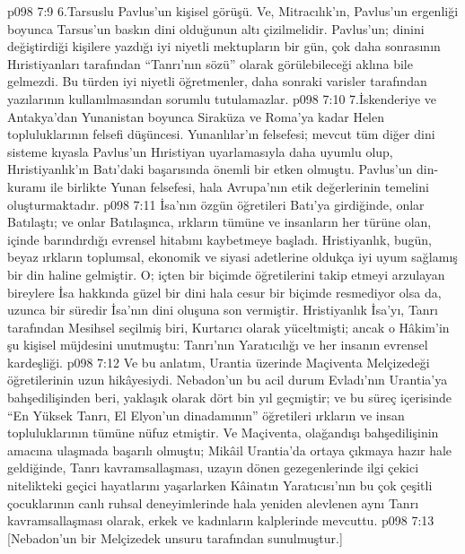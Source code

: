 \vs p098 7:9 6.\bibnobreakspace Tarsuslu Pavlus’un kişisel görüşü. Ve, Mitracılık’ın, Pavlus’un ergenliği boyunca Tarsus’un baskın dini olduğunun altı çizilmelidir. Pavlus’un; dinini değiştirdiği kişilere yazdığı iyi niyetli mektupların bir gün, çok daha sonrasının Hıristiyanları tarafından “Tanrı’nın sözü” olarak görülebileceği aklına bile gelmezdi. Bu türden iyi niyetli öğretmenler, daha sonraki varisler tarafından yazılarının kullanılmasından sorumlu tutulamazlar.
\vs p098 7:10 7.\bibnobreakspace İskenderiye ve Antakya’dan Yunanistan boyunca Siraküza ve Roma’ya kadar Helen topluluklarının felsefi düşüncesi. Yunanlılar’ın felsefesi; mevcut tüm diğer dini sisteme kıyasla Pavlus’un Hıristiyan uyarlamasıyla daha uyumlu olup, Hıristiyanlık’ın Batı’daki başarısında önemli bir etken olmuştu. Pavlus’un din\hyp{}kuramı ile birlikte Yunan felsefesi, hala Avrupa’nın etik değerlerinin temelini oluşturmaktadır.
\vs p098 7:11 İsa’nın özgün öğretileri Batı’ya girdiğinde, onlar Batılaştı; ve onlar Batılaşınca, ırkların tümüne ve insanların her türüne olan, içinde barındırdığı evrensel hitabını kaybetmeye başladı. Hristiyanlık, bugün, beyaz ırkların toplumsal, ekonomik ve siyasi adetlerine oldukça iyi uyum sağlamış bir din haline gelmiştir. O; içten bir biçimde öğretilerini takip etmeyi arzulayan bireylere İsa hakkında güzel bir dini hala cesur bir biçimde resmediyor olsa da, uzunca bir süredir İsa’nın dini oluşuna son vermiştir. Hristiyanlık İsa’yı, Tanrı tarafından Mesihsel seçilmiş biri, Kurtarıcı olarak yüceltmişti; ancak o Hâkim’in şu kişisel müjdesini unutmuştu: Tanrı’nın Yaratıcılığı ve her insanın evrensel kardeşliği.
\vs p098 7:12 Ve bu anlatım, Urantia üzerinde Maçiventa Melçizedeği öğretilerinin uzun hikâyesiydi. Nebadon’un bu acil durum Evladı’nın Urantia’ya bahşedilişinden beri, yaklaşık olarak dört bin yıl geçmiştir; ve bu süreç içerisinde “En Yüksek Tanrı, El Elyon’un dinadamının” öğretileri ırkların ve insan topluluklarının tümüne nüfuz etmiştir. Ve Maçiventa, olağandışı bahşedilişinin amacına ulaşmada başarılı olmuştu; Mikâil Urantia’da ortaya çıkmaya hazır hale geldiğinde, Tanrı kavramsallaşması, uzayın dönen gezegenlerinde ilgi çekici nitelikteki geçici hayatlarını yaşarlarken Kâinatın Yaratıcısı’nın bu çok çeşitli çocuklarının canlı ruhsal deneyimlerinde hala yeniden alevlenen aynı Tanrı kavramsallaşması olarak, erkek ve kadınların kalplerinde mevcuttu.
\vs p098 7:13 [Nebadon’un bir Melçizedek unsuru tarafından sunulmuştur.]
